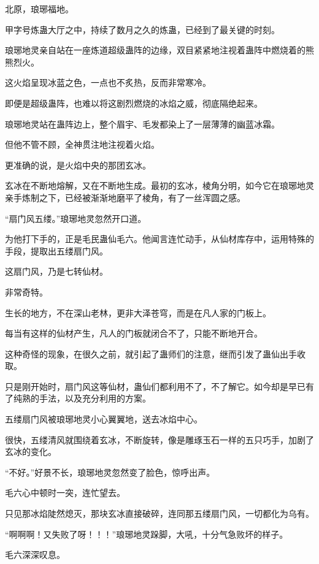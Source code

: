 
\begin{this_body}

北原，琅琊福地。

甲字号炼蛊大厅之中，持续了数月之久的炼蛊，已经到了最关键的时刻。

琅琊地灵亲自站在一座炼道超级蛊阵的边缘，双目紧紧地注视着蛊阵中燃烧着的熊熊烈火。

这火焰呈现冰蓝之色，一点也不炙热，反而非常寒冷。

即便是超级蛊阵，也难以将这剧烈燃烧的冰焰之威，彻底隔绝起来。

琅琊地灵站在蛊阵边上，整个眉宇、毛发都染上了一层薄薄的幽蓝冰霜。

但他不管不顾，全神贯注地注视着火焰。

更准确的说，是火焰中央的那团玄冰。

玄冰在不断地熔解，又在不断地生成。最初的玄冰，棱角分明，如今它在琅琊地灵亲手炼制之下，已经被渐渐地磨平了棱角，有了一丝浑圆之感。

“扇门风五缕。”琅琊地灵忽然开口道。

为他打下手的，正是毛民蛊仙毛六。他闻言连忙动手，从仙材库存中，运用特殊的手段，提取出五缕扇门风。

这扇门风，乃是七转仙材。

非常奇特。

生长的地方，不在深山老林，更非大泽苍穹，而是在凡人家的门板上。

每当有这样的仙材产生，凡人的门板就闭合不了，只能不断地开合。

这种奇怪的现象，在很久之前，就引起了蛊师们的注意，继而引发了蛊仙出手收取。

只是刚开始时，扇门风这等仙材，蛊仙们都利用不了，不了解它。如今却是早已有了纯熟的手法，以及充分利用的方案。

五缕扇门风被琅琊地灵小心翼翼地，送去冰焰中心。

很快，五缕清风就围绕着玄冰，不断旋转，像是雕琢玉石一样的五只巧手，加剧了玄冰的变化。

“不好。”好景不长，琅琊地灵忽然变了脸色，惊呼出声。

毛六心中顿时一突，连忙望去。

只见那冰焰陡然熄灭，那块玄冰直接破碎，连同那五缕扇门风，一切都化为乌有。

“啊啊啊！又失败了呀！！！”琅琊地灵跺脚，大吼，十分气急败坏的样子。

毛六深深叹息。


\end{this_body}
